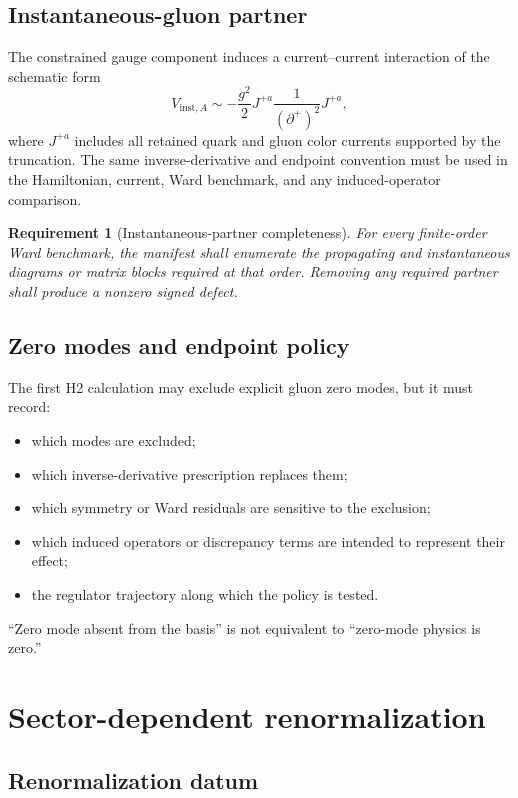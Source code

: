 \documentclass[11pt]{article}
\newtheorem{requirement}[definition]{Requirement}
\begin{document}
\subsection{Instantaneous-gluon partner}

The constrained gauge component induces a current--current interaction of the
schematic form
\begin{equation}
 V_{\mathrm{inst},A}
 \sim
 -\frac{g^2}{2}
 J^{+a}
 \frac{1}{(\partial^+)^2}
 J^{+a},
 \label{eq:inst-gluon}
\end{equation}
where \(J^{+a}\) includes all retained quark and gluon color currents supported
by the truncation.  The same inverse-derivative and endpoint convention must
be used in the Hamiltonian, current, Ward benchmark, and any induced-operator
comparison.

\begin{requirement}[Instantaneous-partner completeness]
For every finite-order Ward benchmark, the manifest shall enumerate the
propagating and instantaneous diagrams or matrix blocks required at that
order.  Removing any required partner shall produce a nonzero signed defect.
\end{requirement}

\subsection{Zero modes and endpoint policy}

The first H2 calculation may exclude explicit gluon zero modes, but it must
record:
\begin{itemize}
 \item which modes are excluded;
 \item which inverse-derivative prescription replaces them;
 \item which symmetry or Ward residuals are sensitive to the exclusion;
 \item which induced operators or discrepancy terms are intended to represent
 their effect;
 \item the regulator trajectory along which the policy is tested.
\end{itemize}
``Zero mode absent from the basis'' is not equivalent to ``zero-mode physics is
zero.''

\section{Sector-dependent renormalization}

\subsection{Renormalization datum}
\end{document}

